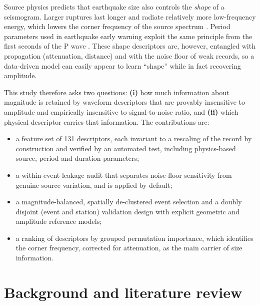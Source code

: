 \documentclass[11pt,a4paper]{article}
\begin{document}
Source physics predicts that earthquake size also controls the
\emph{shape} of a seismogram. Larger ruptures last longer and radiate
relatively more low-frequency energy, which lowers the corner frequency of
the source spectrum \citep{brune1970,boatwright1980,abercrombie1995}.
Period parameters used in earthquake early warning exploit the same
principle from the first seconds of the P wave \citep{allen2003,kanamori2005,wu2005}.
These shape descriptors are, however, entangled with propagation (attenuation,
distance) and with the noise floor of weak records, so a data-driven model
can easily appear to learn ``shape'' while in fact recovering amplitude.

This study therefore asks two questions: \textbf{(i)} how much information
about magnitude is retained by waveform descriptors that are provably
insensitive to amplitude and empirically insensitive to signal-to-noise
ratio, and \textbf{(ii)} which physical descriptor carries that information.
The contributions are:
\begin{itemize}
  \item a feature set of 131 descriptors, each invariant to a rescaling of the
    record by construction and verified by an automated test, including
    physics-based source, period and duration parameters;
  \item a within-event leakage audit that separates noise-floor sensitivity from
    genuine source variation, and is applied by default;
  \item a magnitude-balanced, spatially de-clustered event selection and a
    doubly disjoint (event and station) validation design with explicit
    geometric and amplitude reference models;
  \item a ranking of descriptors by grouped permutation importance, which
    identifies the corner frequency, corrected for attenuation, as the main
    carrier of size information.
\end{itemize}

\section{Background and literature review}
\label{sec:lit}
\end{document}
